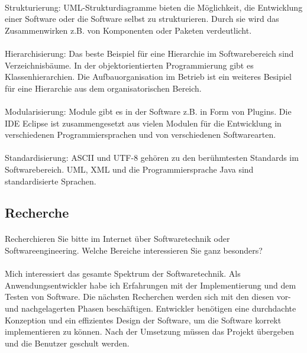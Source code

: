 \documentclass{article}
\begin{document}
\paragraph{}
Strukturierung: UML-Strukturdiagramme bieten die Möglichkeit, die Entwicklung
einer Software oder die Software selbst zu strukturieren. Durch sie wird das
Zusammenwirken z.B. von Komponenten oder Paketen verdeutlicht.

\paragraph{}
Hierarchisierung: Das beste Beispiel für eine Hierarchie im Softwarebereich sind
Verzeichnisbäume. In der objektorientierten Programmierung gibt es
Klassenhierarchien. Die Aufbauorganisation im Betrieb ist ein weiteres Besipiel
für eine Hierarchie aus dem organisatorischen Bereich.

\paragraph{}
Modularisierung: Module gibt es in der Software z.B. in Form von Plugins. Die
IDE Eclipse ist zusammengesetzt aus vielen Modulen für die Entwicklung in
verschiedenen Programmiersprachen und von verschiedenen Softwarearten.

\paragraph{}
Standardisierung: ASCII und UTF-8 gehören zu den berühmtesten Standards im
Softwarebereich. UML, XML und die Programmiersprache Java sind standardisierte
Sprachen.

\subsection{Recherche}
\paragraph{}
Recherchieren Sie bitte im Internet über Softwaretechnik oder Softwareengineering. Welche Bereiche interessieren Sie ganz besonders?

\paragraph{}
Mich interessiert das gesamte Spektrum der Softwaretechnik. Als
Anwendungsentwickler habe ich Erfahrungen mit der Implementierung und dem
Testen von Software. Die nächsten Recherchen werden sich mit den diesen vor-
und nachgelagerten Phasen beschäftigen. Entwickler benötigen eine durchdachte
Konzeption und ein effizientes Design der Software, um die Software korrekt
implementieren zu können. Nach der Umsetzung müssen das Projekt übergeben und
die Benutzer geschult werden.
\end{document}
